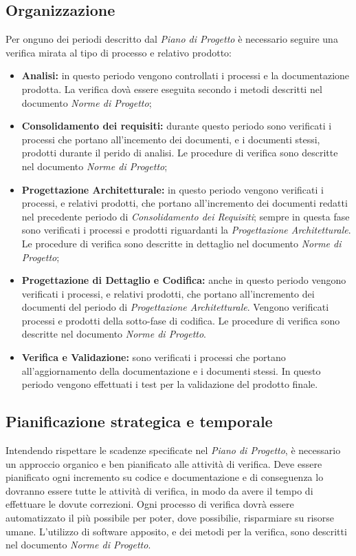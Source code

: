   \subsection{Organizzazione}
    Per onguno dei periodi descritto dal \emph{Piano di Progetto} è necessario seguire una verifica mirata al tipo di processo e relativo prodotto:
    \begin{itemize}
      \item \textbf{Analisi:} in questo periodo vengono controllati i processi e la documentazione prodotta.
      La verifica dovà essere eseguita secondo i metodi descritti nel documento \emph{Norme di Progetto};
      \item \textbf{Consolidamento dei requisiti:} durante questo periodo sono verificati i processi che portano all'incemento dei documenti, e i documenti stessi, prodotti durante il perido di analisi.
      Le procedure di verifica sono descritte nel documento \emph{Norme di Progetto};
      \item \textbf{Progettazione Architetturale:} in questo periodo vengono verificati i processi, e relativi prodotti, che portano all'incremento dei documenti redatti nel precedente periodo di \emph{Consolidamento dei Requisiti};
      sempre in questa fase sono verificati i processi e prodotti riguardanti la \emph{Progettazione Architetturale}.
      Le procedure di verifica sono descritte in dettaglio nel documento \emph{Norme di Progetto};
      \item \textbf{Progettazione di Dettaglio e Codifica:} anche in questo periodo vengono verificati i processi, e relativi prodotti, che portano all'incremento dei documenti del periodo di \emph{Progettazione Architetturale}.
      Vengono verificati processi e prodotti della sotto-fase di codifica. Le procedure di verifica sono descritte nel documento \emph{Norme di Progetto}.
      \item \textbf{Verifica e Validazione:} sono verificati i processi che portano all'aggiornamento della documentazione e i documenti stessi.
      In questo periodo vengono effettuati i test per la validazione del prodotto finale.
    \end{itemize}

  \subsection{Pianificazione strategica e temporale}
    Intendendo rispettare le scadenze specificate nel \emph{Piano di Progetto}, è necessario un approccio organico e ben pianificato alle attività di verifica.
    Deve essere pianificato ogni incremento su codice e documentazione e di conseguenza lo dovranno essere tutte le attività di verifica,
    in modo da avere il tempo di effettuare le dovute correzioni. Ogni processo di verifica dovrà essere automatizzato il più possibile per poter, dove possibilie,
    risparmiare su risorse umane. L'utilizzo di software apposito, e dei metodi per la verifica, sono descritti nel documento \emph{Norme di Progetto}.

